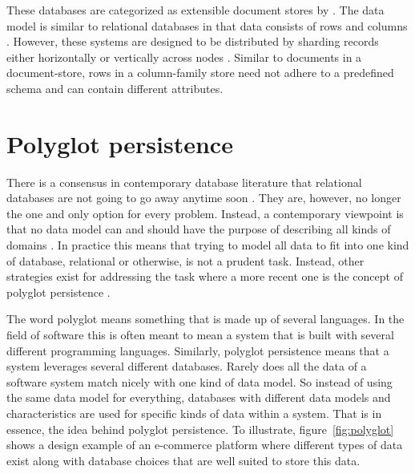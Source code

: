 These databases are categorized as extensible document stores by \cite{Catell}. The data model is similar to relational databases in that data consists of rows and columns \cite{Catell}. However, these systems are designed to be distributed by sharding records either horizontally or vertically across nodes \cite{10rules}. Similar to documents in a document-store, rows in a column-family store need not adhere to a predefined schema and can contain different attributes. 


\section{Polyglot persistence}
\label{sec:pp}
There is a consensus in contemporary database literature that relational databases are not going to go away anytime soon \cite{Catell, NoSQLDistilled, NoSQLSurvey}. They are, however, no longer the one and only option for every problem. Instead, a contemporary viewpoint is that no data model can and should have the purpose of describing all kinds of domains \cite{NoSQLDistilled, NoSQLSurvey}. In practice this means that trying to model all data to fit into one kind of database, relational or otherwise, is not a prudent task. Instead, other strategies \cite{ORM} exist for addressing the task where a more recent one is the concept of polyglot persistence \cite{NoSQLDistilled}. 

The word polyglot means something that is made up of several languages. In the field of software this is often meant to mean a system that is built with several different programming languages. Similarly, polyglot persistence means that a system leverages several different databases. Rarely does all the data of a software system match nicely with one kind of data model. So instead of using the same data model for everything, databases with different data models and characteristics are used for specific kinds of data within a system. That is in essence, the idea behind polyglot persistence. To illustrate, figure~\ref{fig:polyglot} shows a design example of an e-commerce platform where different types of data exist along with database choices that are well suited to store this data.


